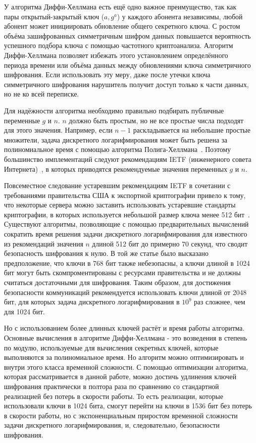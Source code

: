 \documentclass[times,specification,annotation]{itmo-student-thesis}
\begin{document}
У алгоритма Диффи-Хеллмана есть ещё одно важное преимущество, так как пары открытый-закрытый ключ ($a, g^a$) у каждого абонента независимы, любой абонент может инициировать
обновление общего секретного ключа.
С ростом объёма зашифрованных симметричным шифром данных повышается вероятность успешного подбора ключа с помощью
частотного криптоанализа.
Алгоритм Диффи-Хеллмана позволяет избежать этого установлением определённого периода времени или объёма данных
между обновлениями ключа симметричного шифрования.
Если использовать эту меру, даже после утечки ключа симметричного шифрования нарушитель получит доступ только к части
данных, но не ко всей переписке.

Для надёжности алгоритма необходимо правильно подбирать публичные переменные $g$ и $n$.
$n$ должно быть простым, но не все простые числа подходят для этого значения.
Например, если $n-1$ раскладывается на небольшие простые множители, задача дискретного логарифмирования
может быть решена за полиномиальное время с помощью алгоритма Полига-Хеллмана~\cite{men01}.
Поэтому большинство имплементаций следуют рекомендациям IETF (инженерного совета Интернета)~\cite{rfc7296}, в которых
приводятся рекомендуемые значения переменных $g$ и $n$.

Повсеместное следование устаревшим рекомендациям IETF в сочетании с требованиями правительства США к экспортной криптографии
привело к тому, что некоторые сервера можно заставить использовать устаревшие стандарты криптографии, в которых
используется небольшой размер ключа менее 512 бит~\cite{adr15}.
Существуют алгоритмы, позволяющие с помощью предварительных вычислений сократить время решения задачи
дискретного логарифмирования для известного из рекомендаций значения $n$ длиной 512 бит до примерно 70 секунд, что сводит
безопасность шифрования к нулю.
В той же статье было высказано предположение, что ключи в 768 бит также небезопасны, а ключи длиной
в 1024 бит могут быть скомпроментированы с ресурсами правительства и не должны считаться достаточными для шифрования.
Таким образом, для достижения безопасности коммуникаций рекомендуется использовать ключи длиной от 2048 бит,
для которых задача дискретного логарифмирования в $10^9$ раз сложнее, чем для 1024 бит.

Но с использованием более длинных ключей растёт и время работы алгоритма.
Основные вычисления в алгоритме Диффи-Хеллмана - это возведения в степень по модулю, используемые для вычисления секретных ключей,
которые выполняются за полиномиальное время.
Но алгоритм можно оптимизировать и внутри этого класса временной сложности.
С помощью оптимизации алгоритма, которая рассматривается в данной работе, можно достичь удлинения ключей шифрования
практически в полтора раза по сравнению со стандартной реализацией без потерь в скорости работы.
То есть реализации, которые использовали ключи в 1024 бита, смогут перейти на ключи в 1536 бит без потерь в скорости работы,
но с экспоненциальным приростом временной сложности задачи дискретного логарифмирования, и, следовательно, безопасности
шифрования.
\end{document}
